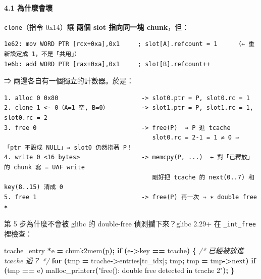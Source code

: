 \documentclass[10pt,a4paper]{article}
\newenvironment{Shaded}{\begin{snugshade}}{\end{snugshade}}
\newcommand{\CommentTok}[1]{\textcolor[rgb]{0.56,0.35,0.01}{\textit{#1}}}
\newcommand{\ControlFlowTok}[1]{\textcolor[rgb]{0.13,0.29,0.53}{\textbf{#1}}}
\newcommand{\NormalTok}[1]{#1}
\newcommand{\OperatorTok}[1]{\textcolor[rgb]{0.81,0.36,0.00}{\textbf{#1}}}
\newcommand{\StringTok}[1]{\textcolor[rgb]{0.31,0.60,0.02}{#1}}
\renewenvironment{Shaded}{%
  \def\FrameCommand{\fboxsep=3.2pt\colorbox{shadecolor}}%
  \MakeFramed{\advance\hsize-\width\FrameRestore\small}%
}{%
  \endMakeFramed
}
\begin{document}
\paragraph{4.1 為什麼會壞}\label{ux70baux4ec0ux9ebcux6703ux58de}

\texttt{clone}（指令 0x14）讓 \textbf{兩個 slot 指向同一塊 chunk}，但：

\begin{Verbatim}[breaklines=true,breakanywhere=true,breakautoindent=false,fontsize=\fontsize{7.0}{9.5}\selectfont]
1e62: mov WORD PTR [rcx+0xa],0x1     ; slot[A].refcount = 1     （← 重新設定成 1，不是「共用」）
1e6b: add WORD PTR [rax+0xa],0x1     ; slot[B].refcount++
\end{Verbatim}

⇒ 兩邊各自有一個獨立的計數器。於是：

\begin{Verbatim}[breaklines=true,breakanywhere=true,breakautoindent=false,fontsize=\fontsize{7.0}{9.5}\selectfont]
1. alloc 0 0x80                       -> slot0.ptr = P, slot0.rc = 1
2. clone 1 <- 0（A=1 空, B=0）         -> slot1.ptr = P, slot1.rc = 1, slot0.rc = 2
3. free 0                             -> free(P)  ⇒ P 進 tcache
                                         slot0.rc = 2-1 = 1 ≠ 0 ⇒ 「ptr 不設成 NULL」⇒ slot0 仍然指著 P！
4. write 0 <16 bytes>                 -> memcpy(P, ...)  ← 對「已釋放」的 chunk 寫 = UAF write
                                         剛好把 tcache 的 next(0..7) 和 key(8..15) 清成 0
5. free 1                             -> free(P) 再一次 ⇒ ✶ double free ✶
\end{Verbatim}

第 5 步為什麼不會被 glibc 的 double-free 偵測攔下來？glibc 2.29+ 在
\texttt{\_\allowbreak{}int\_\allowbreak{}free} 裡檢查：

\begin{Shaded}
\begin{Highlighting}[]
\NormalTok{tcache\_entry }\OperatorTok{*}\NormalTok{e }\OperatorTok{=}\NormalTok{ chunk2mem}\OperatorTok{(}\NormalTok{p}\OperatorTok{);}
\ControlFlowTok{if} \OperatorTok{(}\NormalTok{e}\OperatorTok{{-}\textgreater{}}\NormalTok{key }\OperatorTok{==}\NormalTok{ tcache}\OperatorTok{)} \OperatorTok{\{}          \CommentTok{/* 已經被放進 tcache 過？ */}
    \ControlFlowTok{for} \OperatorTok{(}\NormalTok{tmp }\OperatorTok{=}\NormalTok{ tcache}\OperatorTok{{-}\textgreater{}}\NormalTok{entries}\OperatorTok{[}\NormalTok{tc\_idx}\OperatorTok{];}\NormalTok{ tmp}\OperatorTok{;}\NormalTok{ tmp }\OperatorTok{=}\NormalTok{ tmp}\OperatorTok{{-}\textgreater{}}\NormalTok{next}\OperatorTok{)}
        \ControlFlowTok{if} \OperatorTok{(}\NormalTok{tmp }\OperatorTok{==}\NormalTok{ e}\OperatorTok{)}\NormalTok{ malloc\_printerr}\OperatorTok{(}\StringTok{"free(): double free detected in tcache 2"}\OperatorTok{);}
\OperatorTok{\}}
\end{Highlighting}
\end{Shaded}
\end{document}
